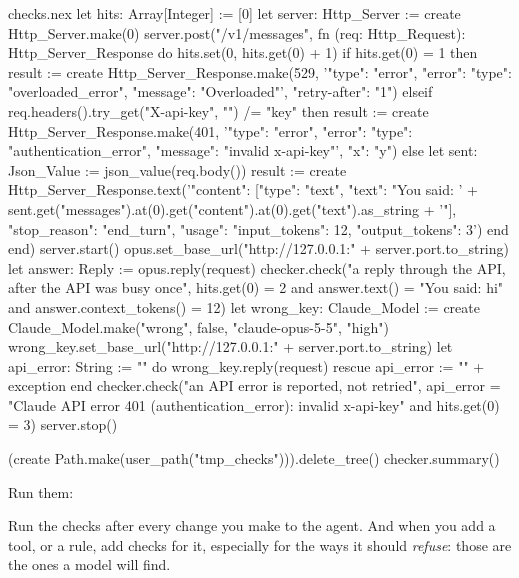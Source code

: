 \begin{continued}{checks.nex}
let hits: Array[Integer] := [0]
let server: Http_Server := create Http_Server.make(0)
server.post("/v1/messages", fn (req: Http_Request): Http_Server_Response do
  hits.set(0, hits.get(0) + 1)
  if hits.get(0) = 1 then
    result := create Http_Server_Response.make(529,
      '{"type": "error", "error": {"type": "overloaded_error", "message": "Overloaded"}}', {"retry-after": "1"})
  elseif req.headers().try_get("X-api-key", "") /= "key" then
    result := create Http_Server_Response.make(401,
      '{"type": "error", "error": {"type": "authentication_error", "message": "invalid x-api-key"}}', {"x": "y"})
  else
    let sent: Json_Value := json_value(req.body())
    result := create Http_Server_Response.text('{"content": [{"type": "text", "text": "You said: '
      + sent.get("messages").at(0).get("content").at(0).get("text").as_string
      + '"}], "stop_reason": "end_turn", "usage": {"input_tokens": 12, "output_tokens": 3}}')
  end
end)
server.start()
opus.set_base_url("http://127.0.0.1:" + server.port.to_string)
let answer: Reply := opus.reply(request)
checker.check("a reply through the API, after the API was busy once", hits.get(0) = 2
  and answer.text() = "You said: hi" and answer.context_tokens() = 12)
let wrong_key: Claude_Model := create Claude_Model.make("wrong", false, "claude-opus-5-5", "high")
wrong_key.set_base_url("http://127.0.0.1:" + server.port.to_string)
let api_error: String := ""
do
  wrong_key.reply(request)
rescue
  api_error := "" + exception
end
checker.check("an API error is reported, not retried",
  api_error = "Claude API error 401 (authentication_error): invalid x-api-key" and hits.get(0) = 3)
server.stop()

(create Path.make(user_path("tmp_checks"))).delete_tree()
checker.summary()
\end{continued}

Run them:


Run the checks after every change you make to the agent. And when you add
a tool, or a rule, add checks for it, especially for the ways it should
\emph{refuse}: those are the ones a model will find.

